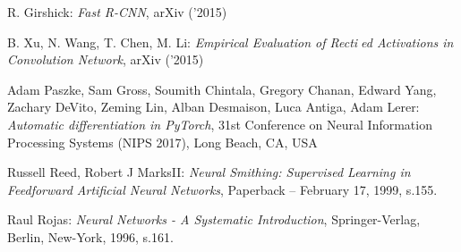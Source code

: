 \begin{thebibliography}{99}
   R. Girshick:
  \emph{Fast R-CNN},
  arXiv ('2015)

   B. Xu, N. Wang, T. Chen, M. Li:
  \emph{Empirical Evaluation of Rectied Activations in Convolution Network},
   arXiv ('2015)

   Adam Paszke, Sam Gross, Soumith Chintala, Gregory Chanan,
   Edward Yang, Zachary DeVito, Zeming Lin, Alban Desmaison, Luca Antiga, Adam Lerer:
   \emph{Automatic differentiation in PyTorch}, 31st Conference on Neural Information
   Processing Systems (NIPS 2017), Long Beach, CA, USA

    Russell Reed,  Robert J MarksII:
  \emph{Neural Smithing: Supervised Learning in Feedforward Artificial Neural Networks},
  Paperback – February 17, 1999, s.155.

   Raul Rojas:
  \emph{Neural Networks - A Systematic Introduction},
  Springer-Verlag, Berlin, New-York, 1996, s.161.


\end{thebibliography}
